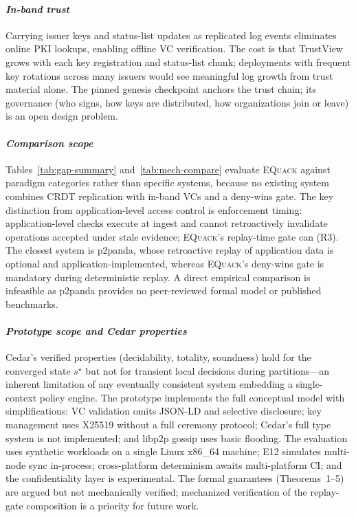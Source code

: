 \documentclass[10pt,journal,compsoc]{IEEEtran}
\newcommand{\equack}{\textsc{EQuack}}
\begin{document}
\paragraph*{\textit{In-band trust}}
Carrying issuer keys and status-list updates as replicated log events eliminates online PKI lookups, enabling offline VC verification. The cost is that TrustView grows with each key registration and status-list chunk; deployments with frequent key rotations across many issuers would see meaningful log growth from trust material alone. The pinned genesis checkpoint anchors the trust chain; its governance (who signs, how keys are distributed, how organizations join or leave) is an open design problem.

\paragraph*{\textit{Comparison scope}}
Tables~\ref{tab:gap-summary} and~\ref{tab:mech-compare} evaluate \equack{} against paradigm categories rather than specific systems, because no existing system combines CRDT replication with in-band VCs and a deny-wins gate. The key distinction from application-level access control is enforcement timing: application-level checks execute at ingest and cannot retroactively invalidate operations accepted under stale evidence; \equack{}'s replay-time gate can (R3). The closest system is p2panda, whose retroactive replay of application data is optional and application-implemented, whereas \equack{}'s deny-wins gate is mandatory during deterministic replay. A direct empirical comparison is infeasible as p2panda provides no peer-reviewed formal model or published benchmarks.

\paragraph*{\textit{Prototype scope and Cedar properties}}
Cedar's verified properties (decidability, totality, soundness) hold for the converged state $s^\star$ but not for transient local decisions during partitions---an inherent limitation of any eventually consistent system embedding a single-context policy engine. The prototype implements the full conceptual model with simplifications: VC validation omits JSON-LD and selective disclosure; key management uses X25519 without a full ceremony protocol; Cedar's full type system is not implemented; and libp2p gossip uses basic flooding. The evaluation uses synthetic workloads on a single Linux x86\_64 machine; E12 simulates multi-node sync in-process; cross-platform determinism awaits multi-platform CI; and the confidentiality layer is experimental. The formal guarantees (Theorems~1--5) are argued but not mechanically verified; mechanized verification of the replay-gate composition is a priority for future work.
\end{document}
